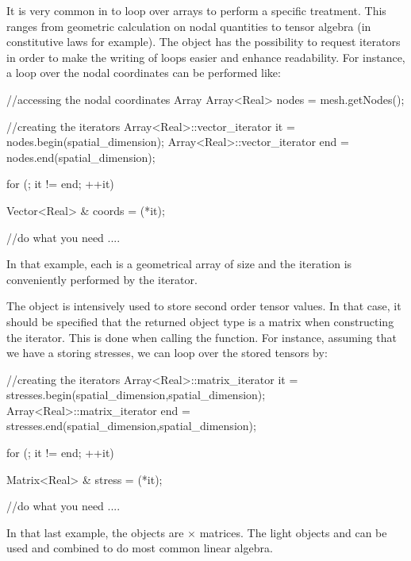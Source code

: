 It is very common in \akantu to loop over arrays to perform a specific
treatment. This ranges from geometric calculation on nodal quantities
to tensor algebra (in constitutive laws for example).
The  object has the possibility to request iterators
in order to make the writing of loops easier and enhance readability.
For instance, a loop over the nodal coordinates can be performed like:
\begin{cpp}
  //accessing the nodal coordinates Array
  Array<Real> nodes = mesh.getNodes();

  //creating the iterators
  Array<Real>::vector_iterator it  = nodes.begin(spatial_dimension);
  Array<Real>::vector_iterator end = nodes.end(spatial_dimension);

  for (; it != end; ++it){
    Vector<Real> & coords = (*it);

    //do what you need
    ....

  }
\end{cpp}
In that example, each  is a geometrical array of
size  and the iteration is conveniently
performed by the  iterator.

The  object is intensively used to store second order
tensor values.  In that case, it should be specified that the returned
object type is a matrix when constructing the iterator. This is done
when calling the  function. For instance, assuming that we
have a  storing stresses, we can loop over the stored
tensors by:

\begin{cpp}
  //creating the iterators
  Array<Real>::matrix_iterator it  = stresses.begin(spatial_dimension,spatial_dimension);
  Array<Real>::matrix_iterator end = stresses.end(spatial_dimension,spatial_dimension);

  for (; it != end; ++it){
    Matrix<Real> & stress = (*it);

    //do what you need
    ....

  }
\end{cpp}
In that last example, the  objects are
 $\times$  matrices.
The light objects  and  can be used and
combined to do most common linear algebra.


